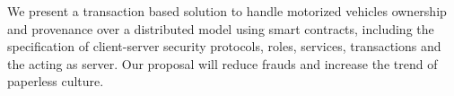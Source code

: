 We present a transaction based solution to handle motorized vehicles ownership 
and provenance over a distributed model using smart contracts,  
including the specification of client-server security protocols,
roles, services, transactions and the \blockchaincarnetwork acting as server.
Our proposal will reduce frauds and increase the trend of paperless culture.